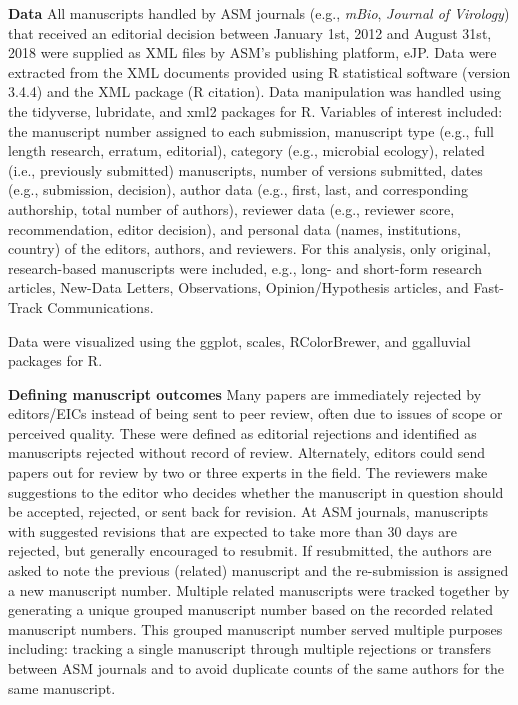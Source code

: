 \documentclass[11pt,]{article}
\begin{document}
\textbf{Data} All manuscripts handled by ASM journals (e.g.,
\emph{mBio}, \emph{Journal of Virology}) that received an editorial
decision between January 1st, 2012 and August 31st, 2018 were supplied
as XML files by ASM's publishing platform, eJP. Data were extracted from
the XML documents provided using R statistical software (version 3.4.4)
and the XML package (R citation). Data manipulation was handled using
the tidyverse, lubridate, and xml2 packages for R. Variables of interest
included: the manuscript number assigned to each submission, manuscript
type (e.g., full length research, erratum, editorial), category (e.g.,
microbial ecology), related (i.e., previously submitted) manuscripts,
number of versions submitted, dates (e.g., submission, decision), author
data (e.g., first, last, and corresponding authorship, total number of
authors), reviewer data (e.g., reviewer score, recommendation, editor
decision), and personal data (names, institutions, country) of the
editors, authors, and reviewers. For this analysis, only original,
research-based manuscripts were included, e.g., long- and short-form
research articles, New-Data Letters, Observations, Opinion/Hypothesis
articles, and Fast-Track Communications.

Data were visualized using the ggplot, scales, RColorBrewer, and
ggalluvial packages for R.

\textbf{Defining manuscript outcomes} Many papers are immediately
rejected by editors/EICs instead of being sent to peer review, often due
to issues of scope or perceived quality. These were defined as editorial
rejections and identified as manuscripts rejected without record of
review. Alternately, editors could send papers out for review by two or
three experts in the field. The reviewers make suggestions to the editor
who decides whether the manuscript in question should be accepted,
rejected, or sent back for revision. At ASM journals, manuscripts with
suggested revisions that are expected to take more than 30 days are
rejected, but generally encouraged to resubmit. If resubmitted, the
authors are asked to note the previous (related) manuscript and the
re-submission is assigned a new manuscript number. Multiple related
manuscripts were tracked together by generating a unique grouped
manuscript number based on the recorded related manuscript numbers. This
grouped manuscript number served multiple purposes including: tracking a
single manuscript through multiple rejections or transfers between ASM
journals and to avoid duplicate counts of the same authors for the same
manuscript.
\end{document}
